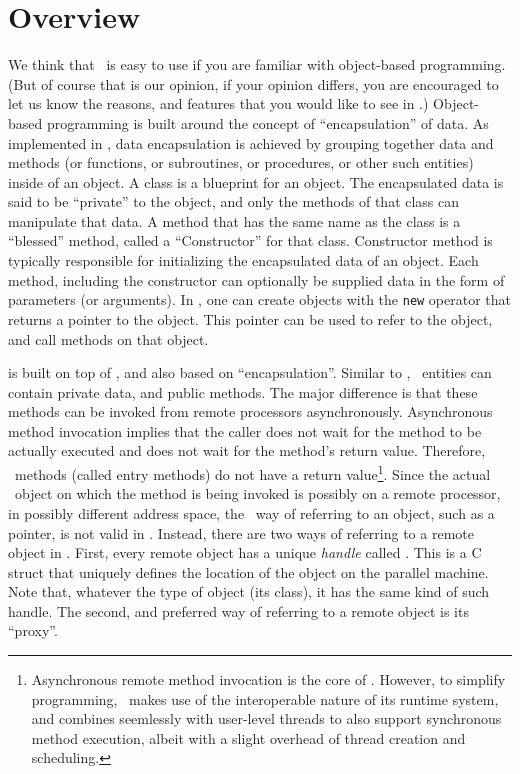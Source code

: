 \chapter{\charmpp{} Overview}

We think that \charmpp\ is easy to use if you are familiar with object-based
programming. (But of course that is our opinion, if your opinion differs, you
are encouraged to let us know the reasons, and features that you would like to
see in \charmpp.) Object-based programming is built around the concept of
``encapsulation'' of data. As implemented in \CC, data encapsulation is
achieved by grouping together data and methods (or functions, or subroutines,
or procedures, or other such entities) inside of an object. A class is a
blueprint for an object.  The encapsulated data is said to be ``private'' to
the object, and only the methods of that class can manipulate that data. A
method that has the same name as the class is a ``blessed'' method, called a
``Constructor'' for that class.  Constructor method is typically responsible
for initializing the encapsulated data of an object. Each method, including the
constructor can optionally be supplied data in the form of parameters (or
arguments). In \CC, one can create objects with the {\tt new} operator that
returns a pointer to the object. This pointer can be used to refer to the
object, and call methods on that object.

\charmpp{} is built on top of \CC, and also based on ``encapsulation''. Similar
to \CC, \charmpp\ entities can contain private data, and public methods. The
major difference is that these methods can be invoked from remote processors
asynchronously.  Asynchronous method invocation implies that the caller does
not wait for the method to be actually executed and does not wait for the
method's return value. Therefore, \charmpp\ methods (called entry methods) do
not have a return value\footnote{Asynchronous remote method invocation is the
core of \charmpp. However, to simplify programming, \charmpp\ makes use of the
interoperable nature of its runtime system, and combines seemlessly with
user-level threads to also support synchronous method execution, albeit with a
slight overhead of thread creation and scheduling.}. Since the actual \charmpp\
object on which the method is being invoked is possibly on a remote processor,
in possibly different address space, the \CC\ way of referring to an object,
such as a pointer, is not valid in \charmpp.  Instead, there are two ways of
referring to a remote object in \charmpp. First, every remote object has a
unique {\em handle} called \kw{ChareID}. This is a C struct that uniquely
defines the location of the object on the parallel machine. Note that, whatever
the type of object (its class), it has the same kind of such handle. The
second, and preferred way of referring to a remote object is its ``proxy''.

